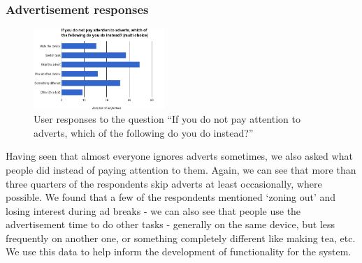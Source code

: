 \subsubsection{Advertisement responses}
\begin{figure}
	\vspace{-10pt}
	\includegraphics[width=0.44\textwidth]{images/prestudy_alternatives.png}
	\caption{User responses to the question ``If you do not pay attention to adverts, which of the following do you do instead?''}
	\label{fig:prestudy_alternatives}
	\vspace{-15pt}
\end{figure}
Having seen that almost everyone ignores adverts sometimes, we also asked what people did instead of paying attention to them. Again, we can see that more than three quarters of the respondents skip adverts at least occasionally, where possible. We found that a few of the respondents mentioned `zoning out' and losing interest during ad breaks - we can also see that people use the advertisement time to do other tasks - generally on the same device, but less frequently on another one, or something completely different like making tea, etc. We use this data to help inform the development of functionality for the system.

